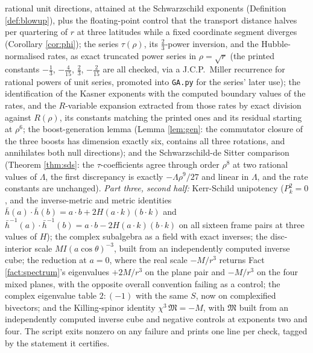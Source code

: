 \documentclass[11pt]{article}
\theoremstyle{definition}
\newcommand{\hb}{\bar{h}}
\begin{document}
rational unit directions, attained at the Schwarzschild exponents (Definition \ref{def:blowup}), plus the floating-point control that the transport distance halves per quartering of $r$ at three latitudes while a fixed coordinate segment diverges (Corollary \ref{cor:phi}); the series $\tau(\rho)$, its $\tfrac23$-power inversion, and the Hubble-normalised rates, as exact truncated power series in $\rho = \sqrt r$ (the printed constants $-\tfrac13$, $-\tfrac{4}{15}$, $\tfrac23$, $-\tfrac{2}{15}$ are all checked, via a J.C.P.\ Miller recurrence for rational powers of unit series, promoted into \verb|GA.py| for the series' later use); the identification of the Kasner exponents with the computed boundary values of the rates, and the $R$-variable expansion extracted from those rates by exact division against $R(\rho)$, its constants matching the printed ones and its residual starting at $\rho^6$; the boost-generation lemma (Lemma \ref{lem:gen}: the commutator closure of the three boosts has dimension exactly six, contains all three rotations, and annihilates both null directions); and the Schwarzschild-de Sitter comparison (Theorem \ref{thm:sds}: the $\tau$-coefficients agree through order $\rho^8$ at two rational values of $\Lambda$, the first discrepancy is exactly $-\Lambda\rho^9/27$ and linear in $\Lambda$, and the rate constants are unchanged). \emph{Part three, second half:} Kerr-Schild unipotency ($P_k^2 = 0$, and the inverse-metric and metric identities $\hb(a)\cdot\hb(b) = a\cdot b + 2H(a\cdot k)(b\cdot k)$ and $\hb^{-1}(a)\cdot\hb^{-1}(b) = a\cdot b - 2H(a\cdot k)(b\cdot k)$ on all sixteen frame pairs at three values of $H$); the complex subalgebra as a field with exact inverses; the disc-interior scale $M I (a\cos\theta)^{-3}$, built from an independently computed inverse cube; the reduction at $a = 0$, where the real scale $-M/r^3$ returns Fact \ref{fact:spectrum}'s eigenvalues $+2M/r^3$ on the plane pair and $-M/r^3$ on the four mixed planes, with the opposite overall convention failing as a control; the complex eigenvalue table $2 : (-1)$ with the same $S$, now on complexified bivectors; and the Killing-spinor identity $\chi^3\,\mathfrak M = -M$, with $\mathfrak M$ built from an independently computed inverse cube and negative controls at exponents two and four. The script exits nonzero on any failure and prints one line per check, tagged by the statement it certifies.
\end{document}
